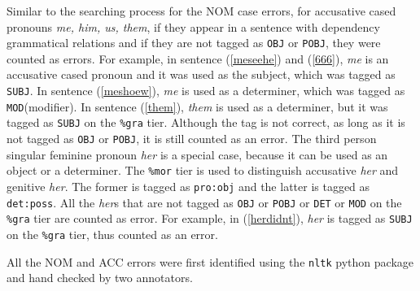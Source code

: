 Similar to the searching process for the NOM case errors, for accusative cased pronouns \textit{me, him, us, them}, if they appear in a sentence with dependency grammatical relations and if they are not tagged as \texttt{OBJ} or \texttt{POBJ}, they were counted as errors. For example, in sentence (\ref{meseehe}) and (\ref{666}), \textit{me} is an accusative cased pronoun and it was used as the subject, which was tagged as \texttt{SUBJ}. In sentence (\ref{meshoew}), \textit{me} is used as a determiner, which was tagged as \texttt{MOD}(modifier). In sentence (\ref{them}), \textit{them} is used as a determiner, but it was tagged as \texttt{SUBJ} on the \texttt{\%gra} tier. Although the tag is not correct, as long as it is not tagged as \texttt{OBJ} or \texttt{POBJ}, it is still counted as an error. The third person singular feminine pronoun \textit{her} is a special case, because it can be used as an object or a determiner. The \texttt{\%mor} tier is used to distinguish accusative \textit{her} and genitive \textit{her}. The former is tagged as \texttt{pro:obj} and the latter is tagged as \texttt{det:poss}. All the \textit{her}s that are not tagged as \texttt{OBJ} or \texttt{POBJ} or \texttt{DET} or \texttt{MOD} on the \texttt{\%gra} tier are counted as error. For example, in (\ref{herdidnt}), \textit{her} is tagged as \texttt{SUBJ} on the \texttt{\%gra} tier, thus counted as an error. 

All the NOM and ACC errors were first identified using the \texttt{nltk} python package and hand checked by two annotators. 

